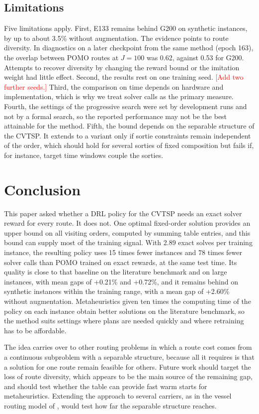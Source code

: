 \documentclass[preprint,12pt,authoryear]{elsarticle}
\newcommand{\placeholder}[1]{\textcolor{red}{[#1]}}
\begin{document}
\subsection{Limitations}

Five limitations apply. First, E133 remains behind G200 on synthetic instances, by up to about 3.5\% without augmentation. The evidence points to route diversity. In diagnostics on a later checkpoint from the same method (epoch 163), the overlap between POMO routes at $J = 100$ was 0.62, against 0.53 for G200. Attempts to recover diversity by changing the reward bound or the imitation weight had little effect. Second, the results rest on one training seed. \placeholder{Add two further seeds.} Third, the comparison on time depends on hardware and implementation, which is why we treat solver calls as the primary measure. Fourth, the settings of the progressive search were set by development runs and not by a formal search, so the reported performance may not be the best attainable for the method. Fifth, the bound depends on the separable structure of the CVTSP. It extends to a variant only if sortie constraints remain independent of the order, which should hold for several sorties of fixed composition but fails if, for instance, target time windows couple the sorties.

\section{Conclusion}
\label{sec:conclusion}

This paper asked whether a DRL policy for the CVTSP needs an exact solver reward for every route. It does not. One optimal fixed-order solution provides an upper bound on all visiting orders, computed by summing table entries, and this bound can supply most of the training signal. With 2.89 exact solves per training instance, the resulting policy uses 15 times fewer instances and 78 times fewer solver calls than POMO trained on exact rewards, at the same test time. Its quality is close to that baseline on the literature benchmark and on large instances, with mean gaps of +0.21\% and +0.72\%, and it remains behind on synthetic instances within the training range, with a mean gap of +2.60\% without augmentation. Metaheuristics given ten times the computing time of the policy on each instance obtain better solutions on the literature benchmark, so the method suits settings where plans are needed quickly and where retraining has to be affordable.

The idea carries over to other routing problems in which a route cost comes from a continuous subproblem with a separable structure, because all it requires is that a solution for one route remain feasible for others. Future work should target the loss of route diversity, which appears to be the main source of the remaining gap, and should test whether the table can provide fast warm starts for metaheuristics. Extending the approach to several carriers, as in the vessel routing model of \citet{ren2026}, would test how far the separable structure reaches.
\end{document}
